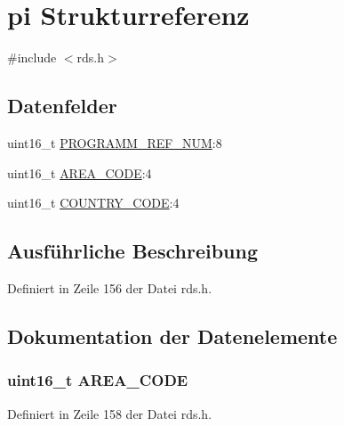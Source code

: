 \hypertarget{structpi}{}\section{pi Strukturreferenz}
\label{structpi}


{\ttfamily \#include $<$rds.\+h$>$}

\subsection*{Datenfelder}
\begin{DoxyCompactItemize}
\item 
uint16\+\_\+t \hyperlink{structpi_aa0995bba54da782b6ff03d66f16e3c57}{P\+R\+O\+G\+R\+A\+M\+M\+\_\+\+R\+E\+F\+\_\+\+N\+U\+M}\+:8
\item 
uint16\+\_\+t \hyperlink{structpi_a71dba196e0ca59278a7cd48f95fd07f3}{A\+R\+E\+A\+\_\+\+C\+O\+D\+E}\+:4
\item 
uint16\+\_\+t \hyperlink{structpi_a104410f64e8aa7ab69f76a5ee53a0a8a}{C\+O\+U\+N\+T\+R\+Y\+\_\+\+C\+O\+D\+E}\+:4
\end{DoxyCompactItemize}


\subsection{Ausführliche Beschreibung}


Definiert in Zeile 156 der Datei rds.\+h.



\subsection{Dokumentation der Datenelemente}
\hypertarget{structpi_a71dba196e0ca59278a7cd48f95fd07f3}{}
\subsubsection[{A\+R\+E\+A\+\_\+\+C\+O\+D\+E}]{\setlength{\rightskip}{0pt plus 5cm}uint16\+\_\+t A\+R\+E\+A\+\_\+\+C\+O\+D\+E}\label{structpi_a71dba196e0ca59278a7cd48f95fd07f3}


Definiert in Zeile 158 der Datei rds.\+h.

\hypertarget{structpi_a104410f64e8aa7ab69f76a5ee53a0a8a}{}
